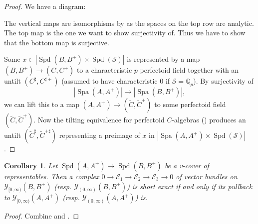 \documentclass[10pt,twoside]{article}
\numberwithin{equation}{section}
\theoremstyle{plain}
\newtheorem{mycor}[mythm]{Corollary}
\theoremstyle{definition}
\DeclareMathOperator{\Spa}{Spa}
\DeclareMathOperator{\Spd}{Spd}
\newcommand{\QQ}{\mathbb{Q}}
\newcommand{\MCE}{\mathcal{E}}
\newcommand{\MCS}{\mathcal{S}}
\newcommand{\MCY}{\mathcal{Y}}
\newcommand{\Yco}{\MCY_{[0,\infty)}}
\newcommand{\Yoo}{\MCY_{(0,\infty)}}
\begin{document}
\begin{proof}
We have a diagram:
\begin{center}
\end{center}
The vertical maps are isomorphisms by \cite[Lemma 15.6]{etCohDiamonds} as the spaces on the top row are analytic. The top map is the one we want to show surjectivity of. Thus we have to show that the bottom map is surjective.\par
Some \(x\in |\Spd(B,B^+)\times \Spd(\MCS)|\) is represented by a map \((B,B^+)\to (C,C^+)\) to a characteristic \(p\) perfectoid field together with an untilt \((C^\sharp,C^{\sharp +})\) (assumed to have characteristic \(0\) if \(\MCS=\QQ_p\)). By surjectivity of
    \[|\Spa(A,A^+)|\longrightarrow |\Spa(B,B^+)|,\]
    we can lift this to a map \((A,A^+)\to (\tilde C,\tilde C^+)\) to some perfectoid field \((\tilde C, \tilde C^+)\). Now the tilting equivalence for perfectoid \(C\)-algebras (\cite[Theorem 6.2.7]{SW20}) produces an untilt \((\tilde C^\sharp, \tilde C^{+\sharp})\) representing a preimage of \(x\) in \(|\Spa(A,A^+)\times \Spd(\MCS)|\).
\end{proof}

\begin{mycor}\label{exactnessVLocalBetweenRepresentables}
        Let \(\Spd(A,A^+)\to \Spd(B,B^+)\) be a v-cover of representables. Then a complex \(0\to\MCE_1\to\MCE_2\to\MCE_3\to0\) of vector bundles on \(\Yco(B,B^+)\) (resp. \(\Yoo(B,B^+)\)) is short exact if and only if its pullback to \(\Yco(A,A^+)\) (resp. \(\Yoo(A,A^+)\)) is.
\end{mycor}

\begin{proof}
Combine  and .
\end{proof}
\end{document}
